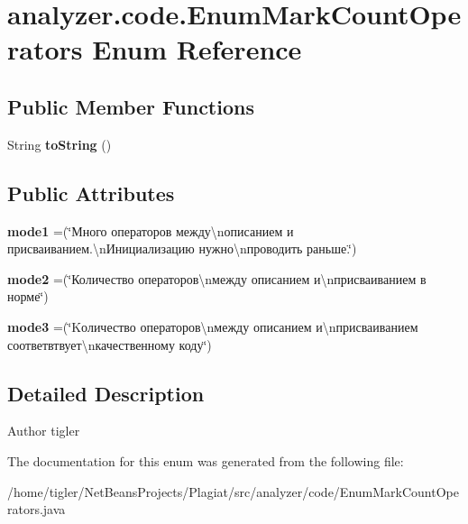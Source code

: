 \hypertarget{enumanalyzer_1_1code_1_1EnumMarkCountOperators}{}\section{analyzer.\+code.\+Enum\+Mark\+Count\+Operators Enum Reference}
\label{enumanalyzer_1_1code_1_1EnumMarkCountOperators}
\subsection*{Public Member Functions}
\begin{DoxyCompactItemize}
\item 
\mbox{\label{enumanalyzer_1_1code_1_1EnumMarkCountOperators_aa561144f51585ce5b6aa8900688baf15}} 
String {\bfseries to\+String} ()
\end{DoxyCompactItemize}
\subsection*{Public Attributes}
\begin{DoxyCompactItemize}
\item 
\mbox{\label{enumanalyzer_1_1code_1_1EnumMarkCountOperators_acc5d0b694750267c0779663fbb88371e}} 
{\bfseries mode1} =(\char`\"{}Много операторов между\textbackslash{}nописанием и присваиванием.\textbackslash{}nИнициализацию нужно\textbackslash{}nпроводить раньше.\char`\"{})
\item 
\mbox{\label{enumanalyzer_1_1code_1_1EnumMarkCountOperators_a2ee4665764352e78a8124eb3969bcba4}} 
{\bfseries mode2} =(\char`\"{}Количество операторов\textbackslash{}nмежду описанием и\textbackslash{}nприсваиванием в норме\char`\"{})
\item 
\mbox{\label{enumanalyzer_1_1code_1_1EnumMarkCountOperators_abad4ece73bc89def2c2c07a8bae1d030}} 
{\bfseries mode3} =(\char`\"{}Kоличество операторов\textbackslash{}nмежду описанием и\textbackslash{}nприсваиванием соответвтвует\textbackslash{}nкачественному коду\char`\"{})
\end{DoxyCompactItemize}


\subsection{Detailed Description}
\begin{DoxyAuthor}{Author}
tigler 
\end{DoxyAuthor}


The documentation for this enum was generated from the following file\+:\begin{DoxyCompactItemize}
\item 
/home/tigler/\+Net\+Beans\+Projects/\+Plagiat/src/analyzer/code/Enum\+Mark\+Count\+Operators.\+java\end{DoxyCompactItemize}
